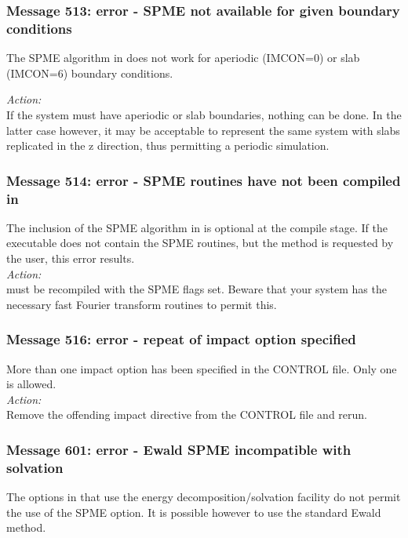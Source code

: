 \subsubsection*{Message 513: error - SPME not available for given
boundary conditions}

The SPME algorithm in \D{} does not work for aperiodic (IMCON=0) or slab
(IMCON=6) boundary conditions.

\noindent
{\em Action:}\\
If the system must have aperiodic or slab boundaries, nothing can be
done. In the latter case however, it may be acceptable to represent
the same system with slabs replicated in the z direction, thus
permitting a periodic simulation.

\subsubsection*{Message 514: error - SPME routines have not been
compiled in} 

The inclusion of the SPME algorithm in \D{} is optional at the compile
stage. If the executable does not contain the SPME routines, but the
method is requested by the user, this error results.\\

\noindent
{\em Action:}\\
\D{} must be recompiled with the SPME flags set. Beware that your system
has the necessary fast Fourier transform routines to permit this.

\subsubsection*{Message 516: error - repeat of impact option specified}

More than one impact option has been specified in the CONTROL
file. Only one is allowed.\\

\noindent
{\em Action:}\\
Remove the offending impact directive from the CONTROL file and rerun.

\subsubsection*{Message 601: error - Ewald SPME incompatible with solvation}

The options in \D{} that use the energy decomposition/solvation facility do not
permit the use of the SPME option. It is possible however to use the standard
Ewald method.\\

